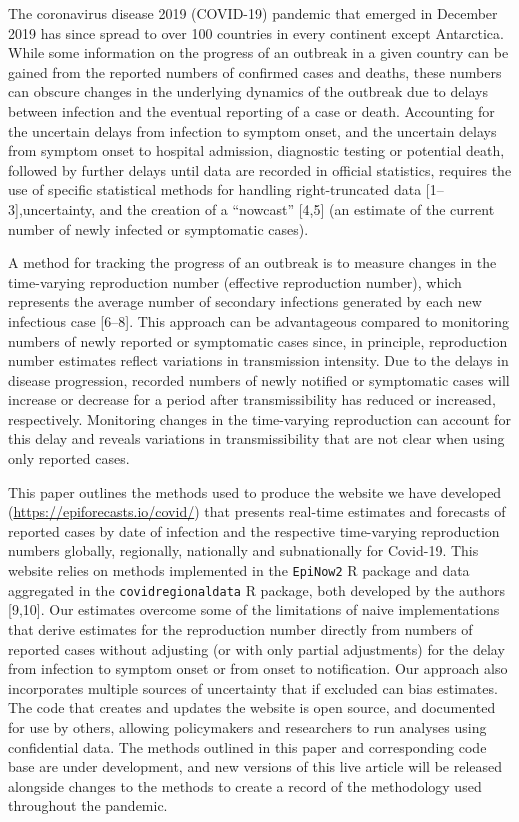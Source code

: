 \documentclass[
]{article}
\begin{document}
The coronavirus disease 2019 (COVID-19) pandemic that emerged in
December 2019 has since spread to over 100 countries in every continent
except Antarctica. While some information on the progress of an outbreak
in a given country can be gained from the reported numbers of confirmed
cases and deaths, these numbers can obscure changes in the underlying
dynamics of the outbreak due to delays between infection and the
eventual reporting of a case or death. Accounting for the uncertain
delays from infection to symptom onset, and the uncertain delays from
symptom onset to hospital admission, diagnostic testing or potential
death, followed by further delays until data are recorded in official
statistics, requires the use of specific statistical methods for
handling right-truncated data {[}1--3{]},uncertainty, and the creation
of a ``nowcast'' {[}4,5{]} (an estimate of the current number of newly
infected or symptomatic cases).

A method for tracking the progress of an outbreak is to measure changes
in the time-varying reproduction number (effective reproduction number),
which represents the average number of secondary infections generated by
each new infectious case {[}6--8{]}. This approach can be advantageous
compared to monitoring numbers of newly reported or symptomatic cases
since, in principle, reproduction number estimates reflect variations in
transmission intensity. Due to the delays in disease progression,
recorded numbers of newly notified or symptomatic cases will increase or
decrease for a period after transmissibility has reduced or increased,
respectively. Monitoring changes in the time-varying reproduction can
account for this delay and reveals variations in transmissibility that
are not clear when using only reported cases.

This paper outlines the methods used to produce the website we have
developed (\url{https://epiforecasts.io/covid/}) that presents real-time
estimates and forecasts of reported cases by date of infection and the
respective time-varying reproduction numbers globally, regionally,
nationally and subnationally for Covid-19. This website relies on
methods implemented in the \texttt{EpiNow2} R package and data
aggregated in the \texttt{covidregionaldata} R package, both developed
by the authors {[}9,10{]}. Our estimates overcome some of the
limitations of naive implementations that derive estimates for the
reproduction number directly from numbers of reported cases without
adjusting (or with only partial adjustments) for the delay from
infection to symptom onset or from onset to notification. Our approach
also incorporates multiple sources of uncertainty that if excluded can
bias estimates. The code that creates and updates the website is open
source, and documented for use by others, allowing policymakers and
researchers to run analyses using confidential data. The methods
outlined in this paper and corresponding code base are under
development, and new versions of this live article will be released
alongside changes to the methods to create a record of the methodology
used throughout the pandemic.
\end{document}

